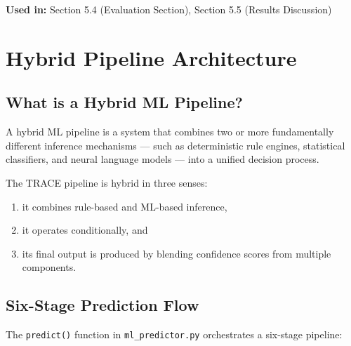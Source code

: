 \documentclass[10pt]{article}
\begin{document}
\textbf{Used in:} Section 5.4 (Evaluation Section), Section 5.5 (Results Discussion)

\section{Hybrid Pipeline Architecture}

\subsection{What is a Hybrid ML Pipeline?}

A hybrid ML pipeline is a system that combines two or more fundamentally different inference mechanisms --- such as deterministic rule engines, statistical classifiers, and neural language models --- into a unified decision process.

The TRACE pipeline is hybrid in three senses:
\begin{enumerate}
    \item it combines rule-based and ML-based inference,
    \item it operates conditionally, and
    \item its final output is produced by blending confidence scores from multiple components.
\end{enumerate}

\subsection{Six-Stage Prediction Flow}

The \texttt{predict()} function in \texttt{ml\_predictor.py} orchestrates a six-stage pipeline:
\end{document}
